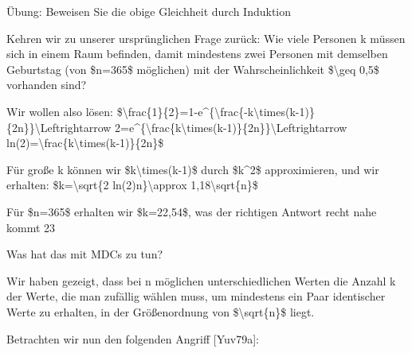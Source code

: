 \documentclass[a4paper]{article}
\begin{document}
\begin{multicols}{3}
\begin{itemize*}
            \begin{itemize*}
                  \item Übung: Beweisen Sie die obige Gleichheit durch Induktion
            \end{itemize*}
            \item
            Kehren wir zu unserer ursprünglichen Frage zurück: Wie viele Personen
            k müssen sich in einem Raum befinden, damit mindestens zwei Personen
            mit demselben Geburtstag (von \$n=365\$ möglichen) mit der
            Wahrscheinlichkeit \$\textbackslash geq 0,5\$ vorhanden sind?

            \begin{itemize*}
                  \item Wir wollen also lösen: \$\textbackslash frac\{1\}\{2\}=1-e\^{}\{\textbackslash frac\{-k\textbackslash times(k-1)\}\{2n\}\}\textbackslash Leftrightarrow 2=e\^{}\{\textbackslash frac\{k\textbackslash times(k-1)\}\{2n\}\}\textbackslash Leftrightarrow ln(2)=\textbackslash frac\{k\textbackslash times(k-1)\}\{2n\}\$
                  \item Für große k können wir \$k\textbackslash times(k-1)\$ durch \$k\^{}2\$ approximieren, und wir erhalten: \$k=\textbackslash sqrt\{2 ln(2)n\}\textbackslash approx 1,18\textbackslash sqrt\{n\}\$
                  \item Für \$n=365\$ erhalten wir \$k=22,54\$, was der richtigen Antwort recht nahe kommt 23
            \end{itemize*}
            \item
            Was hat das mit MDCs zu tun?
            \item
            Wir haben gezeigt, dass bei n möglichen unterschiedlichen Werten die
            Anzahl k der Werte, die man zufällig wählen muss, um mindestens ein
            Paar identischer Werte zu erhalten, in der Größenordnung von
            \$\textbackslash sqrt\{n\}\$ liegt.
            \item
            Betrachten wir nun den folgenden Angriff {[}Yuv79a{]}:


\end{itemize*}
\end{multicols}
\end{document}
